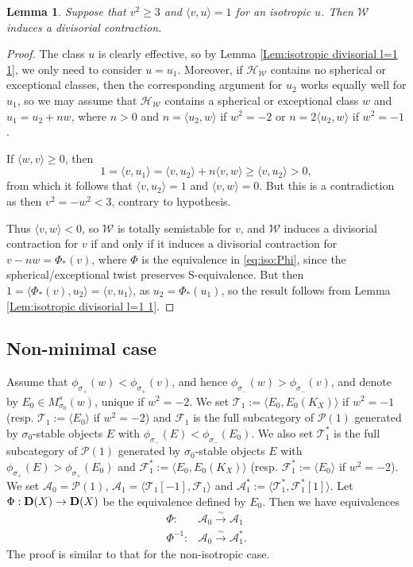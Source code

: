 \documentclass[leqno,11pt]{amsart}
\newtheorem{Lem}[Thm]{Lemma}
\theoremstyle{definition}
\def\AA{\ensuremath{\mathcal A}}
\def\FF{\ensuremath{\mathcal F}}
\def\HH{\ensuremath{\mathcal H}}
\def\PP{\ensuremath{\mathcal P}}
\def\TT{\ensuremath{\mathcal T}}
\def\WW{\ensuremath{\mathcal W}}
\newcommand{\mor}[1][]{\xrightarrow{#1}}
\newcommand{\isomor}{\mor[\sim]}
\begin{document}
\begin{Lem}
Suppose that $v^2\geq 3$ and $\langle v,u\rangle=1$ for an isotropic $u$.  Then $\WW$ induces a divisorial contraction.
\end{Lem}
\begin{proof}
The class $u$ is clearly effective, so by Lemma \ref{Lem:isotropic divisorial l=1 1}, we only need to consider $u=u_1$.  Moreover, if $\HH_\WW$ contains no spherical or exceptional classes, then the corresponding argument for $u_2$ works equally well for $u_1$, so we may assume that $\HH_\WW$ contains a spherical or exceptional class $w$ and $u_1=u_2+nw$, where $n>0$ and $n=\langle u_2,w\rangle$ if $w^2=-2$ or $n=2\langle u_2,w\rangle$ if $w^2=-1$. 

If $\langle w,v\rangle\geq 0$, then $$1=\langle v,u_1\rangle=\langle v,u_2\rangle+n\langle v,w\rangle\geq\langle v,u_2\rangle>0,$$ from which it follows that $\langle v,u_2\rangle=1$ and $\langle v,w\rangle=0$.  But this is a contradiction as then $v^2=-w^2<3$, contrary to hypothesis.

Thus $\langle v,w\rangle<0$, so $\WW$ is totally semistable for $v$, and $\WW$ induces a divisorial contraction for $v$ if and only if it induces a divisorial contraction for $v-nw=\Phi_*(v)$, where $\Phi$ is the equivalence in \eqref{eq:iso:Phi}, since the spherical/exceptional twist preserves S-equivalence.  But then $1=\langle \Phi_*(v),u_2\rangle=\langle v,u_1\rangle$, as $u_2=\Phi_*(u_1)$, so the result follows from Lemma \ref{Lem:isotropic divisorial l=1 1}.
\end{proof}

\subsection{Non-minimal case}

Assume that $\phi_{\sigma_+}(w)<\phi_{\sigma_+}(v)$, and hence
$\phi_{\sigma_-}(w)>\phi_{\sigma_-}(v)$, and denote by $E_0\in M^s_{\sigma_0}(w)$, unique if $w^2=-2$.
We set 
$\TT_1:=\langle E_0,E_0(K_X) \rangle$ if $w^2=-1$ (resp. $\TT_1:=\langle E_0\rangle$ if $w^2=-2$) and
$\FF_1$ is the full subcategory of 
$\PP(1)$ generated by $\sigma_0$-stable objects $E$
with $\phi_{\sigma_-}(E)<\phi_{\sigma_-}(E_0)$.
We also set
$\TT_1^*$ is the full subcategory of 
$\PP(1)$ generated by $\sigma_0$-stable objects $E$
with $\phi_{\sigma_+}(E)>\phi_{\sigma_+}(E_0)$
and
$\FF_1^*:=\langle E_0,E_0(K_X) \rangle$ (resp. $\FF_1^*:=\langle E_0\rangle$ if $w^2=-2$).
We set $\AA_0=\PP(1)$,
$\AA_1=\langle \TT_1[-1],\FF_1 \rangle$ and
$\AA_1^*:=\langle \TT_1^*,\FF_1^*[1] \rangle$.
 Let $\Phi:{\bf D}(X) \to {\bf D}(X)$ be the equivalence
defined by $E_0$.
Then we have equivalences
\begin{equation}
\begin{split}
\Phi:& \AA_0 \isomor \AA_1\\
\Phi^{-1}:&\AA_0 \isomor \AA_1^*.
\end{split}
\end{equation}
The proof is similar to that for the non-isotropic case.
\end{document}
